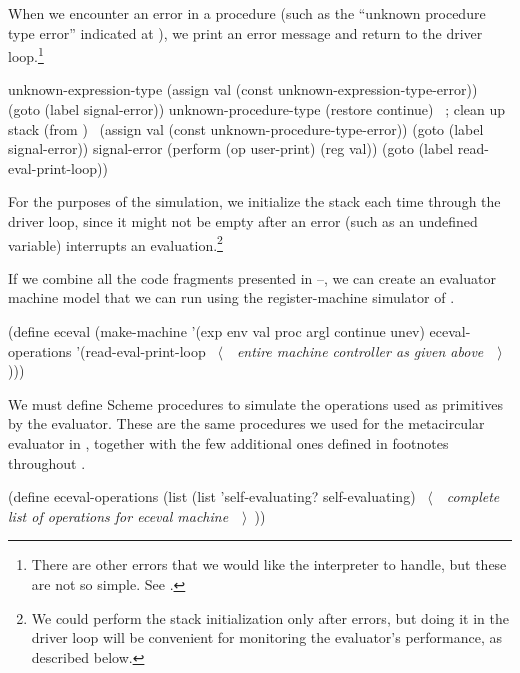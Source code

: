 \noindent
When we encounter an error in a procedure (such as the ``unknown procedure type
error'' indicated at ), we print an error message and
return to the driver loop.\footnote{There are other errors that we would like
the interpreter to handle, but these are not so simple.  See .}

\begin{codeBlock}
unknown-expression-type
  (assign val (const unknown-expression-type-error))
  (goto (label signal-error))
unknown-procedure-type
  (restore continue)    ~\textrm{; clean up stack (from )}~
  (assign val (const unknown-procedure-type-error))
  (goto (label signal-error))
signal-error
  (perform (op user-print) (reg val))
  (goto (label read-eval-print-loop))
\end{codeBlock}

\noindent
For the purposes of the simulation, we initialize the stack each time through
the driver loop, since it might not be empty after an error (such as an
undefined variable) interrupts an evaluation.\footnote{We could perform the
stack initialization only after errors, but doing it in the driver loop will be
convenient for monitoring the evaluator's performance, as described below.}

If we combine all the code fragments presented in
--, we can create an evaluator machine model that we can
run using the register-machine simulator of .

\begin{codeBlock}
(define eceval
  (make-machine
   '(exp env val proc argl continue unev)
   eceval-operations
   '(read-eval-print-loop
     ~\(\langle \)~~\emph{entire machine controller as given above}~~\(\rangle \)~ )))
\end{codeBlock}

\noindent
We must define Scheme procedures to simulate the operations used as primitives
by the evaluator.  These are the same procedures we used for the metacircular
evaluator in , together with the few additional ones defined
in footnotes throughout .

\begin{codeBlock}
(define eceval-operations
  (list (list 'self-evaluating? self-evaluating)
        ~\(\langle \)~~\emph{complete list of operations for eceval machine}~~\(\rangle \)~))
\end{codeBlock}

